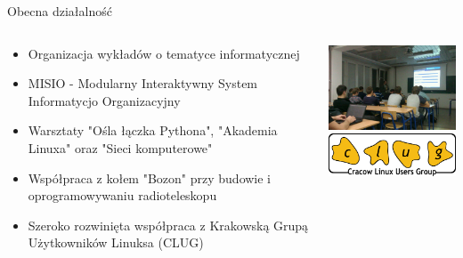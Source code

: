 \documentclass{beamer}
\begin{document}
\begin{frame}{Obecna działalność}
	\begin{minipage}[0.2\textheight]{\textwidth}
	\begin{columns}[T]
	\begin{column}{0.6\textwidth}
	\begin{itemize}
	\item Organizacja wykładów o tematyce informatycznej
	\item MISIO - Modularny Interaktywny System Informatycjo Organizacyjny
	\item Warsztaty "Ośla łączka Pythona", "Akademia Linuxa" oraz "Sieci komputerowe"
	\item Współpraca z kołem "Bozon" przy budowie i oprogramowywaniu radioteleskopu
	\item Szeroko rozwinięta współpraca z Krakowską Grupą Użytkowników Linuksa (CLUG)
	\end{itemize}
	\end{column}
	\begin{column}{0.5\textwidth}
	\vspace{0.5cm}
	\hspace{-0.8cm}
	\includegraphics[width=6cm]{wyklad.jpg}\\
	\vspace{0.5cm}
	\hspace{-0.8cm}
	\includegraphics[width=6cm]{clug.png}
	\end{column}
	\end{columns}

	\end{minipage}
\end{frame}
\end{document}
